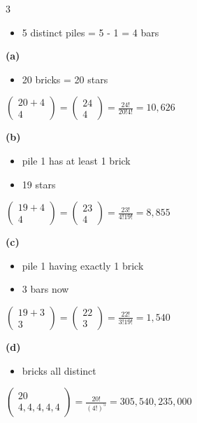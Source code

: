 \documentclass[12 pt]{article}
\begin{document}
    \begin{exercise}{3}
    \hfill

    \begin{itemize}
        \item 5 distinct piles = 5 - 1 = 4 bars
    \end{itemize}

    \textbf{(a)} 
    \begin{itemize}
        \item 20 bricks = 20 stars
    \end{itemize}

    $\begin{pmatrix}
        20 + 4 \\
        4
    \end{pmatrix} = \begin{pmatrix}
        24 \\
        4
    \end{pmatrix} = \frac{24!}{20!4!} = 10,626$

    \textbf{(b)}
    \begin{itemize}
        \item pile 1 has at least 1 brick
        \item 19 stars
    \end{itemize}

    $\begin{pmatrix}
        19 + 4 \\
        4
    \end{pmatrix} = \begin{pmatrix}
        23 \\
        4
    \end{pmatrix} = \frac{23!}{4!19!} = 8,855$

    \textbf{(c)}
    \begin{itemize}
        \item pile 1 having exactly 1 brick
        \item 3 bars now
    \end{itemize}

    $\begin{pmatrix}
        19 + 3 \\
        3
    \end{pmatrix} = \begin{pmatrix}
        22 \\
        3
    \end{pmatrix} = \frac{22!}{3!19!} = 1,540$

    \textbf{(d)}
    \begin{itemize}
        \item bricks all distinct
    \end{itemize}

    $\begin{pmatrix}
        20 \\
        4, 4, 4, 4, 4
    \end{pmatrix} = \frac{20!}{(4!)^5} = 305,540,235,000$    
    \end{exercise}
\end{document}

